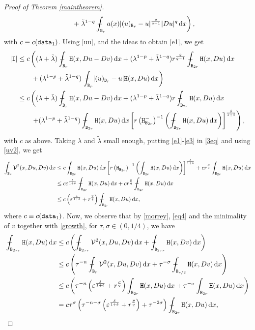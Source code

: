 \documentclass[a4paper]{amsart}
\theoremstyle{plain}  %
\numberwithin{equation}{section}
\def\dx{\,{\rm d}x}
\newcommand{\mint}{\mathop{\int\hskip -1,05em -\, \!\!\!}\nolimits}
\newcommand{\bb}{\tx{B}}
\newcommand{\br}{\tx{B}_{r}}
\newcommand{\brr}{\tx{B}_{2r}}
\newcommand{\ff}{\tx{H}}
\newcommand{\snr}[1]{\lvert #1\rvert}
\newcommand{\tx}[1]{\textnormal{\texttt{#1}}}
\begin{document}
\begin{proof}[Proof of Theorem \ref{maintheorem}]
\begin{align*}
    \qquad + \left . \tilde{\lambda}^{1-q}\mint_{\br}a(x)\snr{(u)_{\br} -u}^{\frac{q}{q-1}} \snr{Du}^q \dx \right ),
\end{align*}
with $c \equiv c(\tx{data}_1)$. Using \eqref{uu}, and the ideas to obtain \eqref{e1}, we get 
\begin{align} \label{e3}
    \snr{\tx{I}} & \leq c   \left ((\lambda + \tilde{\lambda}) \mint_{\br}\ff(x,Du-Dv) \dx + (\lambda^{1-p} +\tilde{\lambda}^{1-q})r^{\frac{q}{q-1}}\mint_{\brr} \ff(x,Du) \dx \right . \notag \\ & \qquad  + (\lambda^{1-p} + \tilde{\lambda}^{1-q})\left .\mint_{\br} \snr{(u)_{\br} -u}\ff(x,Du) \dx \right )\notag \\ & \leq c\left ( (\lambda + \tilde{\lambda}) \mint_{\br}\ff(x,Du-Dv) \dx +(\lambda^{1-p} + \tilde{\lambda}^{1-q})r\mint_{\brr}\ff(x,Du) \dx\right .\notag \\ & \qquad \left .+(\lambda^{1-p} + \tilde{\lambda}^{1-q}) \mint_{\brr}\ff(x,Du) \dx  \left [ r\left (\tx{H}^-_{\brr}\right )^{-1}\left ( \mint_{\brr} \ff(x,Du) \dx\right )\right ]^{\frac{\delta}{1+\delta}}
    \right ),
\end{align}
with $c$ as above. Taking $\lambda$ and $\tilde{\lambda}$ small enough, putting \eqref{e1}-\eqref{e3} in \eqref{3eq} and using \eqref{uv2}, we get
\begin{align} 
      \mint_{\br} \mathcal{V}^2(x,Du,Dv) \dx & \leq c\mint_{\brr}\ff(x,Du) \dx  \left [ r\left (\tx{H}^-_{\brr}\right )^{-1}\left ( \mint_{\brr} \ff(x,Du) \dx\right )\right ]^{\frac{\delta}{1+\delta}}+ cr^{\frac{p}{q}}\mint_{\brr}\ff(x,Du) \dx  \label{torec}  \\ &  \leq c\varepsilon^{\frac{\delta}{1+\delta}} \mint_{\brr}\ff(x,Du) \dx +cr^{\frac{p}{q}} \mint_{\brr}\ff(x,Du) \dx  \notag \\ & \leq c\left ( \varepsilon^{\frac{\delta}{1+\delta}} + r^{\frac{p}{q}}\right )\mint_{\brr}\ff(x,Du) \dx,\label{eq4}
\end{align}
where $c \equiv c(\tx{data}_1)$. Now, we observe that by \eqref{morrey}, \eqref{eq4} and the minimality of $v$ together with \eqref{growth}, for $\tau,\sigma \in (0,1/4)$, we have 
\begin{align} \label{sigma}
    \mint_{\tx{B}_{2\tau r}} \ff(x,Du) \dx & \leq c \left (\mint_{\tx{B}_{2\tau r}} \mathcal{V}^2(x,Du,Dv) \dx + \mint_{\tx{B}_{2\tau r}} \tx{H}(x,Dv) \dx \right ) \notag \\ & \leq c \left (  \tau^{-n}\mint_{\tx{B}_{r}} \mathcal{V}^2(x,Du,Dv) \dx + \tau^{-\sigma} \mint_{\tx{B}_{r/2}} \ff(x,Dv) \dx\right ) \notag \\ & \leq c \left ( \tau^{-n} \left ( \varepsilon^{\frac{\delta}{1+\delta}} + r^{\frac{p}{q}} \right )\mint_{\tx{B}_{2 r}} \ff(x,Du) \dx + \tau^{-\sigma} \mint_{\bb_{2r}} \ff(x,Du) \dx\right ) \notag \\ & = c \tau^{\sigma} \left ( \tau^{-n-\sigma} \left ( \varepsilon^{\frac{\delta}{1+\delta}} + r^{\frac{p}{q}} \right ) + \tau^{-2\sigma} \right )\mint_{\bb_{2r}}\ff(x,Du) \dx,

\end{align}
\end{proof}
\end{document}
